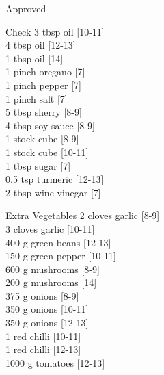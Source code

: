 \begin{menu}{Approved}
\begin{shoppinglist}{Check}
      3 tbsp oil 
        {\scriptsize[10-11]}\\
      4 tbsp oil 
        {\scriptsize[12-13]}\\
      1 tbsp oil 
        {\scriptsize[14]}\\
      1 pinch oregano 
        {\scriptsize[7]}\\
      1 pinch pepper 
        {\scriptsize[7]}\\
      1 pinch salt 
        {\scriptsize[7]}\\
      5 tbsp sherry 
        {\scriptsize[8-9]}\\
      4 tbsp soy sauce 
        {\scriptsize[8-9]}\\
      1  stock cube 
        {\scriptsize[8-9]}\\
      1  stock cube 
        {\scriptsize[10-11]}\\
      1 tbsp sugar 
        {\scriptsize[7]}\\
      0.5 tsp turmeric 
        {\scriptsize[12-13]}\\
      2 tbsp wine vinegar 
        {\scriptsize[7]}\\
      \end{shoppinglist}%
      \begin{shoppinglist}{Extra Vegetables}
      2 cloves garlic 
        {\scriptsize[8-9]}\\
      3 cloves garlic 
        {\scriptsize[10-11]}\\
      400 g green beans 
        {\scriptsize[12-13]}\\
      150 g green pepper 
        {\scriptsize[10-11]}\\
      600 g mushrooms 
        {\scriptsize[8-9]}\\
      200 g mushrooms 
        {\scriptsize[14]}\\
      375 g onions 
        {\scriptsize[8-9]}\\
      350 g onions 
        {\scriptsize[10-11]}\\
      350 g onions 
        {\scriptsize[12-13]}\\
      1  red chilli 
        {\scriptsize[10-11]}\\
      1  red chilli 
        {\scriptsize[12-13]}\\
      1000 g tomatoes 
        {\scriptsize[12-13]}\\
      \end{shoppinglist}%
      \par\vfil %
    \vfil\clearpage
  

\end{menu}

